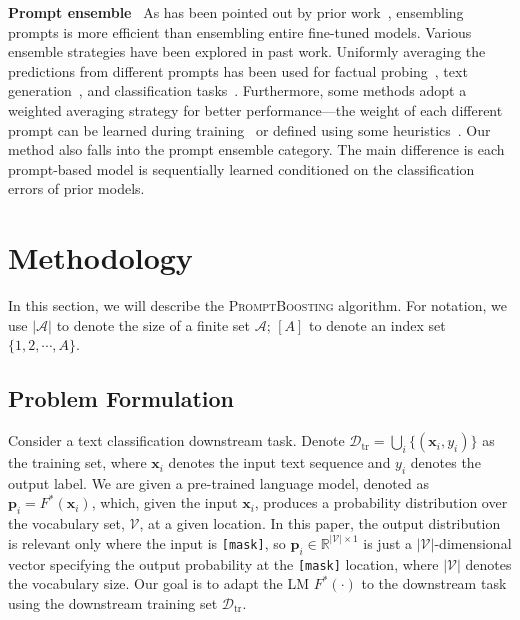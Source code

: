 \documentclass{article}
\theoremstyle{plain}
\theoremstyle{definition}
\theoremstyle{remark}
\newcommand{\alg}{\textsc{PromptBoosting}}
\begin{document}
\textbf{Prompt ensemble} \
As has been pointed out by prior work~\citep{lester2021power}, ensembling prompts is more efficient than ensembling entire fine-tuned models. 
Various ensemble strategies have been explored in past work. Uniformly averaging the predictions from different prompts has been used for factual probing~\citep{jiang2020can}, text generation~\citep{yuan2021bartscore, schick2020few}, and classification tasks~\citep{schick2021exploiting, lester2021power}. Furthermore, some methods adopt a weighted averaging strategy for better performance---the weight of each different prompt can be learned during training~\citep{jiang2020can, qin2021learning} or defined using some heuristics~\citep{schick2021exploiting, schick2021s}. Our method also falls into the prompt ensemble category. The main difference is each prompt-based model is sequentially learned conditioned on the classification errors of prior models.

\section{Methodology}

In this section, we will describe the {\alg} algorithm. For notation, we use $|\mathcal{A}|$ to denote the size of a finite set $\mathcal{A}$; $[A]$ to denote an index set $\{1, 2, \cdots, A\}$. 

\subsection{Problem Formulation}

Consider a text classification downstream task. Denote $\mathcal{D}_{\mathrm{tr}} = \bigcup_i \{(\bm x_i, y_i)\}$ as the training set, where $\bm x_i$ denotes the input text sequence and $y_i$ denotes the output label. We are given a pre-trained language model, denoted as $\bm p_i = F^*(\bm x_i)$, which, given the input $\bm x_i$, produces a probability distribution over the vocabulary set, $\mathcal{V}$, at a given location. In this paper, the output distribution is relevant only where the input is \texttt{[mask]}, so $\bm p_i \in \mathbb{R}^{|\mathcal{V}| \times 1}$ is just a $|\mathcal{V}|$-dimensional vector specifying the output probability at the \texttt{[mask]} location, where $|\mathcal{V}|$ denotes the vocabulary size. Our goal is to adapt the LM $F^*(\cdot)$ to the downstream task using the downstream training set $\mathcal{D}_{\mathrm{tr}}$.
\end{document}
